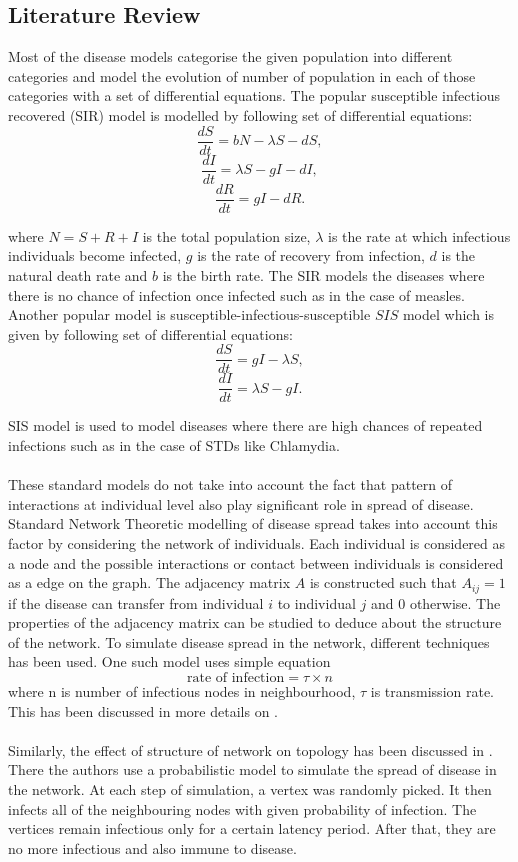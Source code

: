\documentclass[11pt]{article}
\begin{document}
\subsection{Literature Review}
Most of the disease models categorise the given population into different categories and model the evolution of number of population in each of those categories with a set of differential equations. The popular susceptible infectious recovered (SIR) model is modelled by following set of differential equations:
\[ \frac{dS}{dt} = bN - \lambda S - dS,  \]
\[ \frac{dI}{dt} = \lambda S - gI - dI, \]
\[ \frac{dR}{dt} = gI - dR. \]

where $N = S + R + I$ is the total population size, $\lambda$ is the rate at which infectious individuals become infected, $g$ is the rate of recovery from infection, $d$ is the natural death rate and $b$ is the birth rate. The SIR models the diseases where there is no chance of infection once infected such as in the case of measles. Another popular model is susceptible-infectious-susceptible $SIS$ model which is given by following set of differential equations:
\[ \frac{dS}{dt} = gI - \lambda S,  \]
\[ \frac{dI}{dt} = \lambda S - gI. \]

SIS model is used to model diseases where there are high chances of repeated infections such as in the case of STDs like Chlamydia.\\
\\
These standard models do not take into account the fact that pattern of interactions at individual level also play significant role in spread of disease. Standard Network Theoretic modelling of disease spread takes into account this factor by considering the network of individuals. Each individual is considered as a node and the possible interactions or contact between individuals is considered as a edge on the graph. The adjacency matrix $A$ is constructed such that $A_{ij} = 1$ if the disease can transfer from individual $i$ to individual $j$ and $0$ otherwise. The properties of the adjacency matrix can be studied to deduce about the structure of the network. To simulate disease spread in the network, different techniques has been used. One such model uses simple equation
\[ \text {rate of infection} = \tau \times n \] where n is number of infectious nodes in neighbourhood, $\tau$ is transmission rate. This has been discussed in more details on \cite{keeling}.\\
\\
Similarly, the effect of structure of network on topology has been discussed in \cite{shirley}. There the authors use a probabilistic model to simulate the spread of disease in the network. At each step of simulation, a vertex was randomly picked. It then infects all of the neighbouring nodes with given probability of infection. The vertices remain infectious only for a certain latency period. After that, they are no more infectious and also immune to disease.
\end{document}
